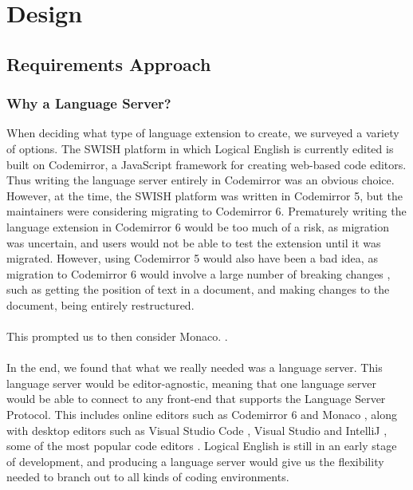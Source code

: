 \documentclass[../main.tex]{subfiles}
\begin{document}
\chapter{Design}
\section{Requirements Approach}
\subsection{Why a Language Server?}
When deciding what type of language extension to create, we surveyed a variety of options. The SWISH platform in which Logical English is currently edited is built on Codemirror, a JavaScript framework for creating web-based code editors. Thus writing the language server entirely in Codemirror was an obvious choice. However, at the time, the SWISH platform was written in Codemirror 5, but the maintainers were considering migrating to Codemirror 6. Prematurely writing the language extension in Codemirror 6 would be too much of a risk, as migration was uncertain, and users would not be able to test the extension until it was migrated. However, using Codemirror 5 would also have been a bad idea, as migration to Codemirror 6 would involve a large number of breaking changes \cite{codemirror_migration}, such as getting the position of text in a document, and making changes to the document, being entirely restructured.
\\ 
\\ 
This prompted us to then consider Monaco. .
\\ 
\\ 
In the end, we found that what we really needed was a language server. This language server would be editor-agnostic, meaning that one language server would be able to connect to any front-end that supports the Language Server Protocol. This includes online editors such as Codemirror 6 \cite{codemirror_6_language_server} and Monaco \cite{monaco_language_server}, along with desktop editors such as Visual Studio Code \cite{vsc_langserver_docs}, Visual Studio \cite{visual_studio_language_server} and IntelliJ \cite{intellij_language_server}, some of the most popular code editors \cite{ide_rankings}. Logical English is still in an early stage of development, and producing a language server would give us the flexibility needed to branch out to all kinds of coding environments.
\end{document}
